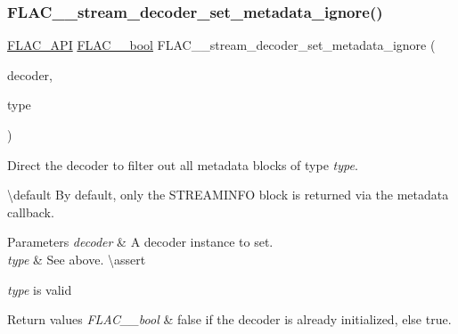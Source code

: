 \subsubsection{\texorpdfstring{FLAC\_\_stream\_decoder\_set\_metadata\_ignore()}{FLAC\_\_stream\_decoder\_set\_metadata\_ignore()}}
{\footnotesize\ttfamily \mbox{\hyperlink{group__flac__export_ga56ca07df8a23310707732b1c0007d6f5}{F\+L\+A\+C\+\_\+\+A\+PI}} \mbox{\hyperlink{ordinals_8h_a95103469f1cbd78b8cf250194985b34e}{F\+L\+A\+C\+\_\+\+\_\+bool}} F\+L\+A\+C\+\_\+\+\_\+stream\+\_\+decoder\+\_\+set\+\_\+metadata\+\_\+ignore (\begin{DoxyParamCaption}\item[{\mbox{\hyperlink{struct_f_l_a_c_____stream_decoder}{F\+L\+A\+C\+\_\+\+\_\+\+Stream\+Decoder}} $\ast$}]{decoder,  }\item[{\mbox{\hyperlink{group__flac__format_gac71714ba8ddbbd66d26bb78a427fac01}{F\+L\+A\+C\+\_\+\+\_\+\+Metadata\+Type}}}]{type }\end{DoxyParamCaption})}

Direct the decoder to filter out all metadata blocks of type {\itshape type}.

\textbackslash{}default By default, only the {\ttfamily S\+T\+R\+E\+A\+M\+I\+N\+FO} block is returned via the metadata callback. 
\begin{DoxyParams}{Parameters}
{\em decoder} & A decoder instance to set. \\
\hline
{\em type} & See above. \textbackslash{}assert 
\begin{DoxyCode}{1}
\end{DoxyCode}
 {\itshape type} is valid \\
\hline
\end{DoxyParams}

\begin{DoxyRetVals}{Return values}
{\em F\+L\+A\+C\+\_\+\+\_\+bool} & {\ttfamily false} if the decoder is already initialized, else {\ttfamily true}. \\
\hline
\end{DoxyRetVals}
\mbox{\label{group__flac__stream__decoder_ga6e515420f5b2a5422cd333b3d4c21064}} 
